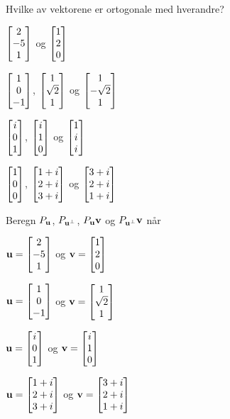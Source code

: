 \begin{oppgave}
Hvilke av vektorene er ortogonale med hverandre?
\begin{punkt}
$\vvv{2}{-5}{1}$ og $\vvv{1}{2}{0}$ \\[4pt]
\end{punkt}

\begin{punkt}
$\vvv{1}{0}{-1}$, $\vvv{1}{\sqrt{2}}{1}$ og $\vvv{1}{-\sqrt{2}}{1}$ \\[4pt]
\end{punkt}

\begin{punkt}
$\vvv{i}{0}{1}$, $\vvv{i}{1}{0}$ og $\vvv{1}{i}{i}$ \\[4pt]
\end{punkt}

\begin{punkt}
$\vvv{1}{0}{0}$, $\vvv{1+i}{2+i}{3+i}$ og $\vvv{3+i}{2+i}{1+i}$ \\[4pt]
\end{punkt}
\end{oppgave}

\begin{oppgave}
Beregn $P_{\V u}$, $P_{\V u^{\perp}}$, $P_{\V u}\V v$ og $P_{\V u^{\perp}}\V v$ når \\[2pt]
\begin{punkt}
$\V{u}=\vvv{2}{-5}{1}$ og $\V{v}=\vvv{1}{2}{0}$\\[4pt]
\end{punkt}

\begin{punkt}
$\V{u}=\vvv{1}{0}{-1}$ og $\V{v}=\vvv{1}{\sqrt{2}}{1}$\\[4pt]
\end{punkt}

\begin{punkt}
$\V{u}=\vvv{i}{0}{1}$ og $\V{v}=\vvv{i}{1}{0}$\\[4pt]
\end{punkt}

\begin{punkt}
$\V{u}=\vvv{1+i}{2+i}{3+i}$ og $\V{v}=\vvv{3+i}{2+i}{1+i}$
\end{punkt}
\end{oppgave}




